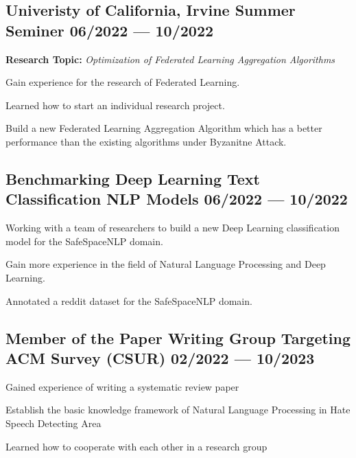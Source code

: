 \documentclass[letter,10pt]{article}
\begin{document}

\subsection{{Univeristy of California, Irvine Summer Seminer \hfill 06/2022 --- 10/2022}}
\begin{zitemize}
\item \textbf{Research Topic:} \textit{Optimization of Federated Learning Aggregation Algorithms}
\item Gain experience for the research of Federated Learning.
\item Learned how to start an individual research project.
\item Build a new Federated Learning Aggregation Algorithm which has a better performance than the existing algorithms under Byzanitne Attack.
\end{zitemize}

\subsection{{Benchmarking Deep Learning Text Classification NLP Models \hfill 06/2022 --- 10/2022}}
\begin{zitemize}
\item Working with a team of researchers to build a new Deep Learning classification model for the SafeSpaceNLP domain.
\item Gain more experience in the field of Natural Language Processing and Deep Learning.
\item Annotated a reddit dataset for the SafeSpaceNLP domain.
\end{zitemize}

\subsection{{Member of the Paper Writing Group Targeting ACM Survey (CSUR) \hfill 02/2022 --- 10/2023}}
\begin{zitemize}
\item Gained experience of writing a systematic review paper
\item Establish the basic knowledge framework of Natural Language Processing in Hate Speech Detecting Area
\item Learned how to cooperate with each other in a research group
\end{zitemize}
\end{document}
